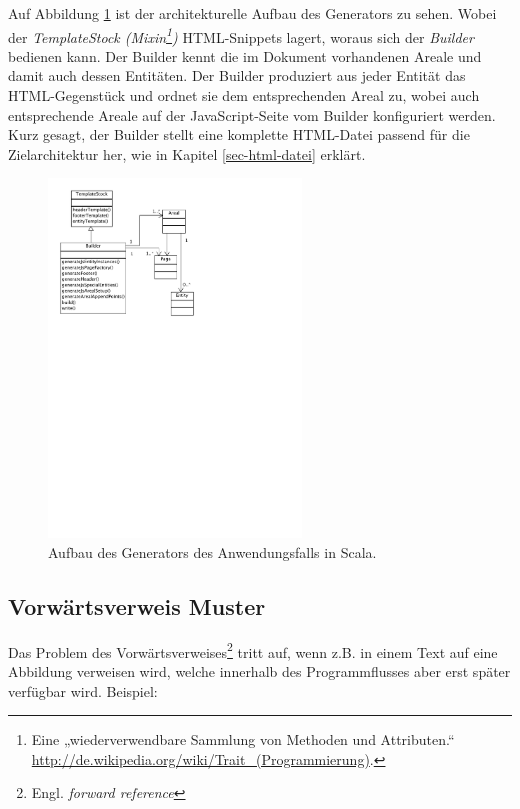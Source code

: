 Auf Abbildung \ref{fig-uml_generator} ist der architekturelle Aufbau
des Generators zu sehen. Wobei der \emph{TemplateStock (Mixin\footnote{
Eine „wiederverwendbare Sammlung von Methoden und Attributen.“
\url{http://de.wikipedia.org/wiki/Trait_(Programmierung)}.
})}
HTML-Snippets lagert, woraus sich der \emph{Builder} bedienen kann.
Der Builder kennt die im Dokument vorhandenen Areale und damit auch dessen
Entitäten. Der Builder produziert aus jeder Entität das HTML-Gegenstück
und ordnet sie dem entsprechenden Areal zu, wobei auch entsprechende
Areale auf der JavaScript-Seite vom Builder konfiguriert werden.
Kurz gesagt, der Builder stellt eine komplette HTML-Datei passend für die
Zielarchitektur her, wie in Kapitel \ref{sec-html-datei} erklärt.

\begin{figure}[h!]
  \centering
    \includegraphics[width=0.6\textwidth]{figures/uml_generator.pdf}
  \caption{Aufbau des Generators des Anwendungsfalls in Scala.}\label{fig-uml_generator}
\end{figure}


\subsection{Vorwärtsverweis Muster}\label{sec-forwardreference}

Das Problem des
Vorwärtsverweises\footnote{Engl. \emph{forward reference}} tritt auf,
wenn z.B. in einem Text auf eine Abbildung
verweisen wird, welche innerhalb des Programmflusses aber erst später verfügbar
wird. Beispiel:

